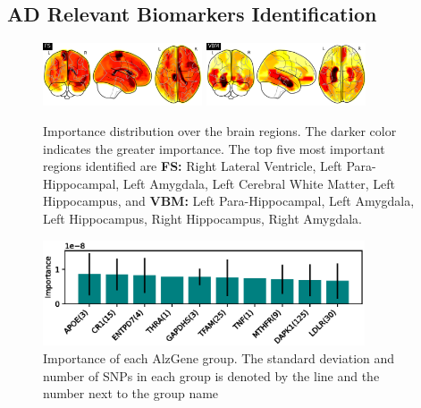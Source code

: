 \subsection{AD Relevant Biomarkers Identification}
\begin{figure}
    \centering
    \includegraphics[width=0.42\textwidth]{images/biomarker-identification/fs.png}
    \includegraphics[width=0.42\textwidth]{images/biomarker-identification/vbm.png}
    \caption{Importance distribution over the brain regions. The darker color indicates the greater importance. The top five most important regions identified are {\bf FS:} Right Lateral Ventricle, Left Para-Hippocampal, Left Amygdala, Left Cerebral White Matter, Left Hippocampus, and {\bf VBM:} Left Para-Hippocampal, Left Amygdala, Left Hippocampus, Right Hippocampus, Right Amygdala.}
    \label{fig: brain map}
\end{figure}
\begin{figure}
    \centering
    \includegraphics[width=0.85\textwidth]{images/biomarker-identification/alzgene-same-color.eps}
    \caption{Importance of each AlzGene group. The standard deviation and number of SNPs in each group is denoted by the line and the number next to the group name}\label{fig: AlzGene}
\end{figure}
